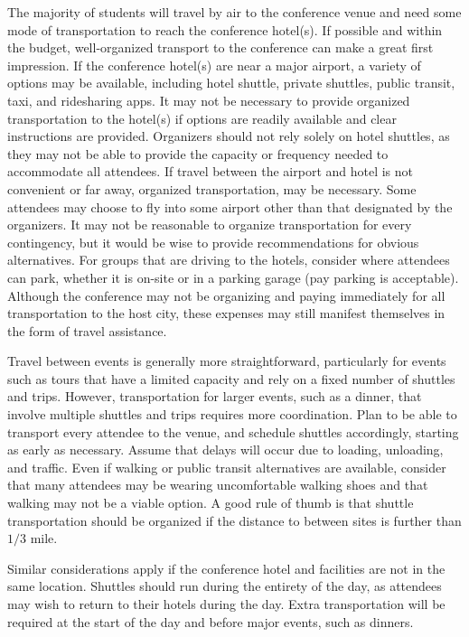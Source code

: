 \documentclass[12pt]{article}
\begin{document}
The majority of students will travel by air to the conference venue and need some mode of transportation to reach the conference hotel(s).
If possible and within the budget, well-organized transport to the conference can make a great first impression.
If the conference hotel(s) are near a major airport, a variety of options may be available, including hotel shuttle, private shuttles, public transit, taxi, and ridesharing apps.
It may not be necessary to provide organized transportation to the hotel(s) if options are readily available and clear instructions are provided.
Organizers should not rely solely on hotel shuttles, as they may not be able to provide the capacity or frequency needed to accommodate all attendees.
If travel between the airport and hotel is not convenient or far away, organized transportation,  may be necessary.
Some attendees may choose to fly into some airport other than that designated by the organizers.
It may not be reasonable to organize transportation for every contingency, but it would be wise to provide recommendations for obvious alternatives.
For groups that are driving to the hotels, consider where attendees can park, whether it is on-site or in a parking garage (pay parking is acceptable).
Although the conference may not be organizing and paying immediately for all transportation to the host city, these expenses may still manifest themselves in the form of travel assistance.

Travel between events is generally more straightforward, particularly for events such as tours that have a limited capacity and rely on a fixed number of shuttles and trips.
However, transportation for larger events, such as a dinner, that involve multiple shuttles and trips requires more coordination.
Plan to be able to transport every attendee to the venue, and schedule shuttles accordingly, starting as early as necessary.
Assume that delays will occur due to loading, unloading, and traffic.
Even if walking or public transit alternatives are available, consider that many attendees may be wearing uncomfortable walking shoes and that walking may not be a viable option.
A good rule of thumb is that shuttle transportation should be organized if the distance to between sites is further than $1/3$ mile.

Similar considerations apply if the conference hotel and facilities are not in the same location.
Shuttles should run during the entirety of the day, as attendees may wish to return to their hotels during the day.
Extra transportation will be required at the start of the day and before major events, such as dinners.
\end{document}
